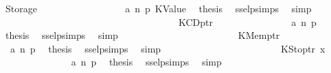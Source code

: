 \begin{isabellebody}
\ {\isacharparenleft}{\kern0pt}Storage\ {\isacharunderscore}{\kern0pt}{\isacharparenright}{\kern0pt}\isanewline
\ \ \ \ \ \ \ \ \ \ \ \ \ \ \isamarkupfalse%
\ {}\ a{}\ n\ p{}\ KValue\ \isamarkupfalse%
\ {\isacharquery}{\kern0pt}thesis\ \isamarkupfalse%
\ ssel{\isachardot}{\kern0pt}psimps{\isacharparenleft}{\kern0pt}{}{\isacharparenright}{\kern0pt}\ \isamarkupfalse%
\ simp\isanewline
\ \ \ \ \ \ \ \ \ \ \ \ \isamarkupfalse%
\isanewline
\ \ \ \ \ \ \ \ \ \ \isamarkupfalse%
\isanewline
\ \ \ \ \ \ \ \ \ \ \ \ \isamarkupfalse%
\ {\isacharparenleft}{\kern0pt}KCDptr\ {\isacharunderscore}{\kern0pt}{\isacharparenright}{\kern0pt}\isanewline
\ \ \ \ \ \ \ \ \ \ \ \ \isamarkupfalse%
\ {}\ a{}\ n\ p{}\ \isamarkupfalse%
\ {\isacharquery}{\kern0pt}thesis\ \isamarkupfalse%
\ ssel{\isachardot}{\kern0pt}psimps{\isacharparenleft}{\kern0pt}{}{\isacharparenright}{\kern0pt}\ \isamarkupfalse%
\ simp\isanewline
\ \ \ \ \ \ \ \ \ \ \isamarkupfalse%
\isanewline
\ \ \ \ \ \ \ \ \ \ \ \ \isamarkupfalse%
\ {\isacharparenleft}{\kern0pt}KMemptr\ {\isacharunderscore}{\kern0pt}{\isacharparenright}{\kern0pt}\isanewline
\ \ \ \ \ \ \ \ \ \ \ \ \isamarkupfalse%
\ {}\ a{}\ n\ p{}\ \isamarkupfalse%
\ {\isacharquery}{\kern0pt}thesis\ \isamarkupfalse%
\ ssel{\isachardot}{\kern0pt}psimps{\isacharparenleft}{\kern0pt}{}{\isacharparenright}{\kern0pt}\ \isamarkupfalse%
\ simp\isanewline
\ \ \ \ \ \ \ \ \ \ \isamarkupfalse%
\isanewline
\ \ \ \ \ \ \ \ \ \ \ \ \isamarkupfalse%
\ {\isacharparenleft}{\kern0pt}KStoptr\ x{}{\isacharparenright}{\kern0pt}\isanewline
\ \ \ \ \ \ \ \ \ \ \ \ \isamarkupfalse%
\ {}\ a{}\ n\ p{}\ \isamarkupfalse%
\ {\isacharquery}{\kern0pt}thesis\ \isamarkupfalse%
\ ssel{\isachardot}{\kern0pt}psimps{\isacharparenleft}{\kern0pt}{}{\isacharparenright}{\kern0pt}\ \isamarkupfalse%
\ simp\isanewline
\ \ \ \ \ \ \ \ \ \ \isamarkupfalse%
\isanewline
\ \ \ \ \ \ \ \ \isamarkupfalse%
\isanewline
\ \ \ \ \ \ \isamarkupfalse%
\isanewline
\ \ \ \ \ \ \ \ \isamarkupfalse%

\end{isabellebody}
